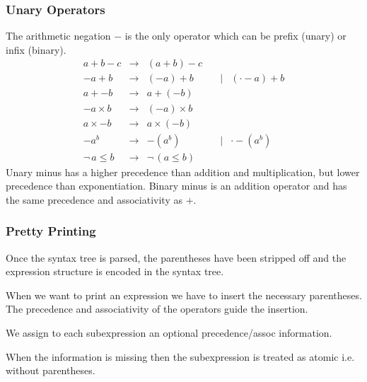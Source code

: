 \subsubsection{Unary Operators}

The arithmetic negation $-$ is the only operator which can be prefix (unary)
or infix (binary).
$$
%
\begin{array}{lllll}

  a + b - c
  & \to
  & (a + b) - c

  \\

  - a + b
  & \to
  & (-a) + b
  & \quad\mid
  & (\cdot - a) + b

  \\

  a + -b
  & \to
  & a + (-b)

  \\

  - a \times b
  & \to
  & (-a) \times b

  \\

  a \times -b
  & \to
  & a \times (-b)

  \\

  - a^b
  & \to
  & -( a^b)
  & \quad\mid
  & \cdot - (a ^ b)

  \\

  \lnot\, a \le b
  & \to
  & \lnot\, (a \le b)
\end{array}
$$
%
Unary minus has a higher precedence than addition and multiplication, but
lower precedence than exponentiation. Binary minus is an addition
operator and has the same precedence and associativity as $+$.




\subsubsection{Pretty Printing}

Once the syntax tree is parsed, the parentheses have been stripped off and the
expression structure is encoded in the syntax tree.

When we want to print an expression we have to insert the necessary
parentheses. The precedence and associativity of the operators guide the
insertion.

We assign to each subexpression an optional precedence/assoc information.

When the information is missing then the subexpression is treated as atomic
i.e. without parentheses.

